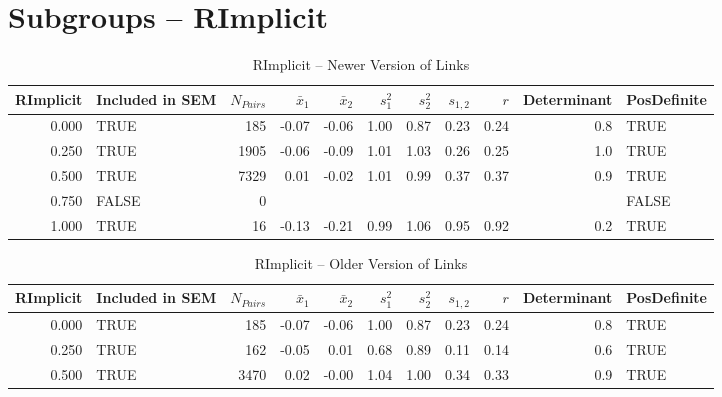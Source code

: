 \documentclass{article}\usepackage[]{graphicx}\usepackage[]{color}
\begin{document}
\section{Subgroups --  RImplicit }%
\begin{table}[ht]
\centering
\begin{tabular}{rlrrrrrrrrl}
  \hline
RImplicit & Included in SEM & $N_{Pairs}$ & $\bar{x}_1$ & $\bar{x}_2$ & $s_1^2$ & $s_2^2$ & $s_{1,2}$ & $r$ & Determinant & PosDefinite \\ 
  \hline
0.000 & TRUE & 185 & -0.07 & -0.06 & 1.00 & 0.87 & 0.23 & 0.24 & 0.8 & TRUE \\ 
  0.250 & TRUE & 1905 & -0.06 & -0.09 & 1.01 & 1.03 & 0.26 & 0.25 & 1.0 & TRUE \\ 
  0.500 & TRUE & 7329 & 0.01 & -0.02 & 1.01 & 0.99 & 0.37 & 0.37 & 0.9 & TRUE \\ 
  0.750 & FALSE & 0 &  &  &  &  &  &  &  & FALSE \\ 
  1.000 & TRUE & 16 & -0.13 & -0.21 & 0.99 & 1.06 & 0.95 & 0.92 & 0.2 & TRUE \\ 
   \hline
\end{tabular}
\caption{RImplicit -- Newer Version of Links} 
\end{table}
\begin{table}[ht]
\centering
\begin{tabular}{rlrrrrrrrrl}
  \hline
RImplicit & Included in SEM & $N_{Pairs}$ & $\bar{x}_1$ & $\bar{x}_2$ & $s_1^2$ & $s_2^2$ & $s_{1,2}$ & $r$ & Determinant & PosDefinite \\ 
  \hline
0.000 & TRUE & 185 & -0.07 & -0.06 & 1.00 & 0.87 & 0.23 & 0.24 & 0.8 & TRUE \\ 
  0.250 & TRUE & 162 & -0.05 & 0.01 & 0.68 & 0.89 & 0.11 & 0.14 & 0.6 & TRUE \\ 
  0.500 & TRUE & 3470 & 0.02 & -0.00 & 1.04 & 1.00 & 0.34 & 0.33 & 0.9 & TRUE \\ 
   \hline
\end{tabular}
\caption{RImplicit -- Older Version of Links} 
\end{table}
\end{document}
